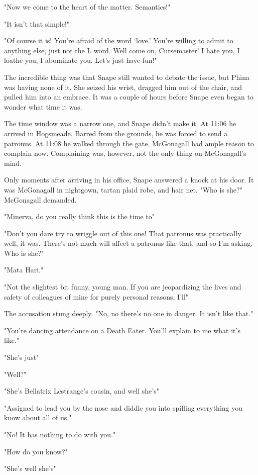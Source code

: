 "Now we come to the heart of the matter. Semantics!"

"It isn't that simple!"

"Of course it is! You're afraid of the word `love.' You're willing to admit to anything else, just not the L word. Well come on, Cursemaster! I hate you, I loathe you, I abominate you. Let's just have fun!"

The incredible thing was that Snape still wanted to debate the issue, but Phina was having none of it. She seized his wrist, dragged him out of the chair, and pulled him into an embrace. It was a couple of hours before Snape even began to wonder what time it was.

The time window was a narrow one, and Snape didn't make it. At 11:06 he arrived in Hogsmeade. Barred from the grounds, he was forced to send a patronus. At 11:08 he walked through the gate. McGonagall had ample reason to complain now. Complaining was, however, not the only thing on McGonagall's mind.

Only moments after arriving in his office, Snape answered a knock at his door. It was McGonagall in nightgown, tartan plaid robe, and hair net. "Who is she?" McGonagall demanded.

"Minerva, do you really think this is the time to{\el}"

"Don't you dare try to wriggle out of this one! That patronus was practically{\el} well, it was. There's not much will affect a patronus like that, and so I'm asking. Who is she?"

"Mata Hari."

"Not the slightest bit funny, young man. If you are jeopardizing the lives and safety of colleagues of mine for purely personal reasons, I'll{\el}"

The accusation stung deeply. "No, no there's no one in danger. It isn't like that."

"You're dancing attendance on a Death Eater. You'll explain to me what it's like."

"She's just{\el}"

"Well?"

"She's Bellatrix Lestrange's cousin, and{\el} well{\el} she's{\el}"

"Assigned to lead you by the nose and diddle you into spilling everything you know about all of us."

"No! It has nothing to do with you."

"How do you know?"

"She's{\el} well{\el} she's{\el}"

